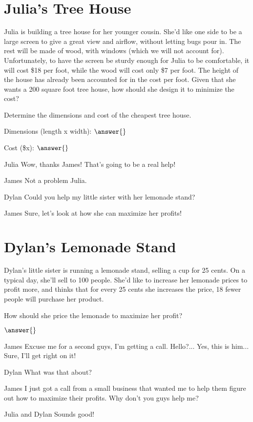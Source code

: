 \documentclass{ximera}
\begin{document}
\section{Julia's Tree House}
Julia is building a tree house for her younger cousin. She'd like one side to be a large screen to give a great view and airflow, without letting bugs pour in. The rest will be made of wood, with windows (which we will not account for). Unfortunately, to have the screen be sturdy enough for Julia to be comfortable, it will cost \$18 per foot, while the wood will cost only \$7 per foot. The height of the house has already been accounted for in the cost per foot. Given that she wants a 200 square foot tree house, how should she design it to minimize the cost?
\begin{question}
Determine the dimensions and cost of the cheapest tree house.

Dimensions (length x width): $\answer{}$

Cost (\$x): $\answer{}$

\end{question}
\begin{dialogue}
\item[Julia] Wow, thanks James! That's going to be a real help!
\item[James] Not a problem Julia.
\item[Dylan] Could you help my little sister with her lemonade stand?
\item[James] Sure, let's look at how she can maximize her profits!
\end{dialogue}

\section{Dylan's Lemonade Stand}
Dylan's little sister is running a lemonade stand, selling a cup for 25 cents. On a typical day, she'll sell to 100 people. She'd like to increase her lemonade prices to profit more, and thinks that for every 25 cents she increases the price, 18 fewer people will purchase her product.
\begin{question}
How should she price the lemonade to maximize her profit?

$\answer{}$
\end{question}
\begin{dialogue}
\item[James] Excuse me for a second guys, I'm getting a call. Hello?... Yes, this is him... Sure, I'll get right on it!
\item[Dylan] What was that about?
\item[James] I just got a call from a small business that wanted me to help them figure out how to maximize their profits. Why don't you guys help me?
\item[Julia and Dylan] Sounds good!
\end{dialogue}
\end{document}
